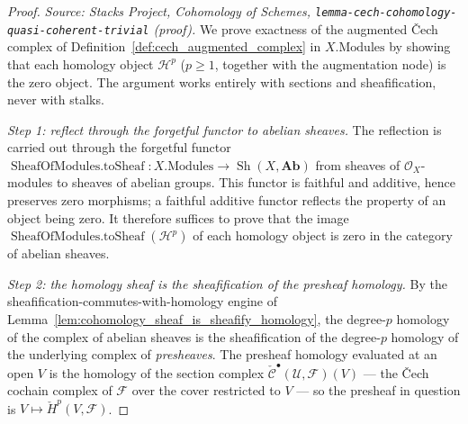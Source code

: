 \begin{proof}
  \textit{Source: Stacks Project, Cohomology of Schemes,
  \texttt{lemma-cech-cohomology-quasi-coherent-trivial} (proof).}
  We prove exactness of the augmented {\v C}ech complex of
  Definition~\ref{def:cech_augmented_complex} in \(X.\mathrm{Modules}\) by showing that each homology
  object \(\mathcal{H}^p\) (\(p \geq 1\), together with the augmentation node) is the zero object. The
  argument works entirely with sections and sheafification, never with stalks.

  \emph{Step 1: reflect through the forgetful functor to abelian sheaves.} The reflection is carried
  out through the forgetful functor \(\operatorname{SheafOfModules.toSheaf} : X.\mathrm{Modules} \to
  \operatorname{Sh}(X, \mathbf{Ab})\) from sheaves of \(\mathcal{O}_X\)-modules to sheaves of abelian
  groups. This functor is faithful and additive, hence preserves zero morphisms; a faithful additive
  functor reflects the property of an object being zero. It therefore suffices to prove that the image
  \(\operatorname{SheafOfModules.toSheaf}(\mathcal{H}^p)\) of each homology object is zero in the
  category of abelian sheaves.

  \emph{Step 2: the homology sheaf is the sheafification of the presheaf homology.} By the
  sheafification-commutes-with-homology engine of
  Lemma~\ref{lem:cohomology_sheaf_is_sheafify_homology}, the degree-\(p\) homology of the complex of
  abelian sheaves is the sheafification of the degree-\(p\) homology of the underlying complex of
  \emph{presheaves}. The presheaf homology evaluated at an open \(V\) is the homology of the section
  complex \(\check{\mathcal{C}}^\bullet(\mathcal{U}, \mathcal{F})(V)\) --- the {\v C}ech cochain complex
  of \(\mathcal{F}\) over the cover restricted to \(V\) --- so the presheaf in question is
  \(V \mapsto \check{H}^p(V, \mathcal{F})\).


\end{proof}
